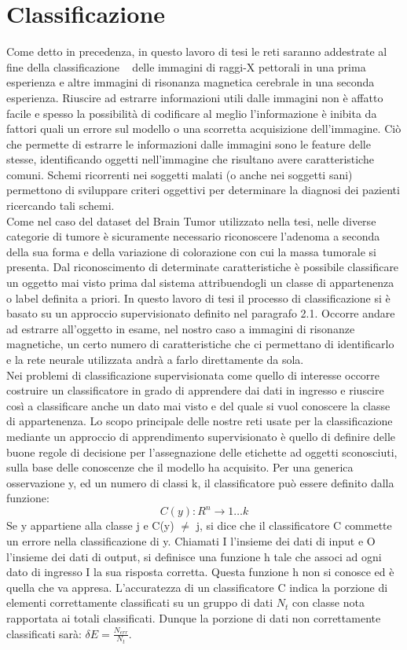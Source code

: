 \section{Classificazione}
Come detto in precedenza, in questo lavoro di tesi le reti saranno addestrate al fine 
della classificazione  ~\cite{classdef} delle immagini di raggi-X pettorali in una prima esperienza e altre immagini
 di risonanza magnetica cerebrale in una seconda
esperienza. 
Riuscire ad estrarre informazioni utili dalle immagini non è affatto facile e spesso 
la possibilità di codificare al meglio l’informazione è inibita da fattori quali un errore 
sul modello o una scorretta acquisizione dell’immagine. Ciò che permette di estrarre le 
informazioni dalle immagini sono le feature delle stesse, identificando oggetti nell’immagine
 che risultano avere caratteristiche comuni. Schemi ricorrenti nei soggetti malati (o anche
  nei soggetti sani) permettono di sviluppare criteri oggettivi per determinare la diagnosi 
  dei pazienti ricercando tali schemi.\\
   Come nel caso del dataset del Brain Tumor utilizzato 
  nella tesi, nelle diverse categorie di tumore è sicuramente necessario riconoscere l’adenoma 
  a seconda della sua forma e della variazione di colorazione con cui la massa tumorale si presenta.
   Dal riconoscimento di determinate
   caratteristiche è possibile classificare un oggetto mai visto prima dal sistema attribuendogli
    un classe di appartenenza o label definita a priori.
In questo lavoro di tesi il processo di classificazione si è basato su un approccio supervisionato
 definito nel paragrafo 2.1. Occorre andare ad estrarre all’oggetto in esame, 
 nel nostro caso a immagini di risonanze magnetiche, un certo numero di caratteristiche 
 che ci permettano di identificarlo e la rete neurale utilizzata andrà a farlo direttamente da sola.\\
 Nei problemi di classificazione 
supervisionata come quello di interesse occorre costruire un classificatore in grado di 
apprendere dai dati in ingresso e riuscire così a classificare anche un dato mai visto e
 del quale si vuol conoscere la classe di appartenenza. 
Lo scopo principale delle nostre reti usate per la classificazione mediante un approccio 
di apprendimento supervisionato è quello di definire delle buone regole di decisione per
 l’assegnazione delle etichette ad oggetti sconosciuti, sulla base delle conoscenze che 
 il modello ha acquisito. Per una generica osservazione y, ed un numero di classi k, il 
 classificatore può essere definito dalla funzione:
\[C(y) : R^{n} \rightarrow 1 … k\] 
Se y appartiene alla classe j e C(y) \(\neq\) j, si dice che il classificatore C commette un errore
nella classificazione di y. Chiamati I l’insieme dei dati di input e O l’insieme dei dati
 di output, si definisce una funzione h tale che associ ad ogni dato di ingresso I la sua 
 risposta corretta. Questa funzione h non si conosce ed è quella che va appresa.
  L’accuratezza di un classificatore C indica la porzione di elementi correttamente 
  classificati su un gruppo di dati \(N_t\) con classe nota rapportata ai totali classificati. 
  Dunque la porzione di dati non correttamente classificati sarà: \( \delta E = \frac{N_{err}}{N_t}\).

